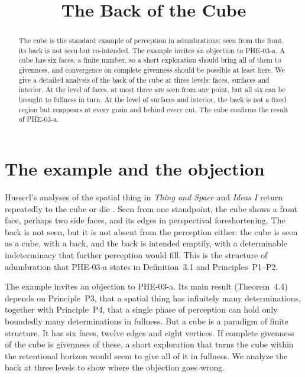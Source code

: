 \documentclass{situationist-preprint}
\title{The Back of the Cube}
\begin{document}
\maketitle

\begin{abstract}
The cube is the standard example of perception in adumbrations: seen from the front, its back is not seen but co-intended. The example invites an objection to PHE-03-a. A cube has six faces, a finite number, so a short exploration should bring all of them to givenness, and convergence on complete givenness should be possible at least here. We give a detailed analysis of the back of the cube at three levels: faces, surfaces and interior. At the level of faces, at most three are seen from any point, but all six can be brought to fullness in turn. At the level of surfaces and interior, the back is not a fixed region but reappears at every grain and behind every cut. The cube confirms the result of PHE-03-a.
\end{abstract}

\section{The example and the objection}

Husserl's analyses of the spatial thing in \emph{Thing and Space} and \emph{Ideas I} return repeatedly to the cube or die \citep{Husserl1973,Husserl1913}. Seen from one standpoint, the cube shows a front face, perhaps two side faces, and its edges in perspectival foreshortening. The back is not seen, but it is not absent from the perception either: the cube is seen as a cube, with a back, and the back is intended emptily, with a determinable indeterminacy that further perception would fill. This is the structure of adumbration that PHE-03-a states in Definition~3.1 and Principles~P1--P2.

The example invites an objection to PHE-03-a. Its main result (Theorem~4.4) depends on Principle~P3, that a spatial thing has infinitely many determinations, together with Principle~P4, that a single phase of perception can hold only boundedly many determinations in fullness. But a cube is a paradigm of finite structure. It has six faces, twelve edges and eight vertices. If complete givenness of the cube is givenness of these, a short exploration that turns the cube within the retentional horizon would seem to give all of it in fullness. We analyze the back at three levels to show where the objection goes wrong.
\end{document}

